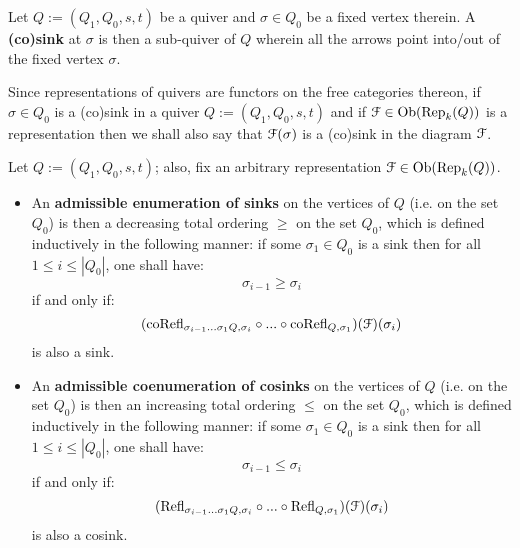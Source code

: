             \begin{definition}[(Co)sinks] \label{def: (co)sinks}
                Let $Q := (Q_1, Q_0, s, t)$ be a quiver and $\sigma \in Q_0$ be a fixed vertex therein. A \textbf{(co)sink} at $\sigma$ is then a sub-quiver of $Q$ wherein all the arrows point into/out of the fixed vertex $\sigma$. 
            \end{definition}
            \begin{convention}
                Since representations of quivers are functors on the free categories thereon, if $\sigma \in Q_0$ is a (co)sink in a quiver $Q := (Q_1, Q_0, s, t)$ and if $\mathcal{F} \in \mathrm{Ob}(\mathrm{Rep}_k(Q))$ is a representation then we shall also say that $\mathcal{F}(\sigma)$ is a (co)sink in the diagram $\mathcal{F}$.  
            \end{convention}
            \begin{definition} \label{def: admissible_enumerations_of_(co)sinks}
                Let $Q := (Q_1, Q_0, s, t)$; also, fix an arbitrary representation $\mathcal{F} \in \mathrm{Ob}(\mathrm{Rep}_k(Q))$. 
                    \begin{itemize}
                        \item An \textbf{admissible enumeration of sinks} on the vertices of $Q$ (i.e. on the set $Q_0$) is then a decreasing total ordering $\geq$ on the set $Q_0$, which is defined inductively in the following manner: if some $\sigma_1 \in Q_0$ is a sink then for all $1 \leq i \leq |Q_0|$, one shall have:
                            $$\sigma_{i - 1} \geq \sigma_i$$
                        if and only if:
                            $$(\mathrm{co}\mathrm{Refl}_{\sigma_{i - 1} ... \sigma_1 Q, \sigma_i} \circ ... \circ \mathrm{co}\mathrm{Refl}_{Q, \sigma_1})(\mathcal{F})(\sigma_i)$$
                        is also a sink.
                        \item An \textbf{admissible coenumeration of cosinks} on the vertices of $Q$ (i.e. on the set $Q_0$) is then an increasing total ordering $\leq$ on the set $Q_0$, which is defined inductively in the following manner: if some $\sigma_1 \in Q_0$ is a sink then for all $1 \leq i \leq |Q_0|$, one shall have:
                            $$\sigma_{i - 1} \leq \sigma_i$$
                        if and only if:
                            $$(\mathrm{Refl}_{\sigma_{i - 1} ... \sigma_1 Q, \sigma_i} \circ ... \circ \mathrm{Refl}_{Q, \sigma_1})(\mathcal{F})(\sigma_i)$$
                        is also a cosink.
                    \end{itemize}
            \end{definition}
